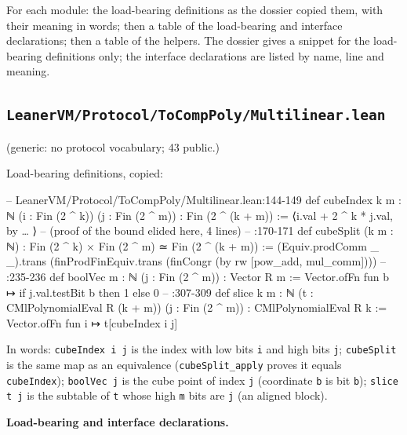 For each module: the load-bearing definitions as the dossier copied them, with their meaning in words; then a table of the load-bearing and interface declarations; then a table of the helpers. The dossier gives a snippet for the load-bearing definitions only; the interface declarations are listed by name, line and meaning.

\subsection{\texttt{LeanerVM/Protocol/ToCompPoly/Multilinear.lean}}

(generic: no protocol vocabulary; 43 public.)

Load-bearing definitions, copied:

\begin{leancode}
-- LeanerVM/Protocol/ToCompPoly/Multilinear.lean:144-149
def cubeIndex {k m : ℕ} (i : Fin (2 ^ k)) (j : Fin (2 ^ m)) : Fin (2 ^ (k + m)) :=
  ⟨i.val + 2 ^ k * j.val, by … ⟩            -- (proof of the bound elided here, 4 lines)
-- :170-171
def cubeSplit (k m : ℕ) : Fin (2 ^ k) × Fin (2 ^ m) ≃ Fin (2 ^ (k + m)) :=
  (Equiv.prodComm _ _).trans (finProdFinEquiv.trans (finCongr (by rw [pow_add, mul_comm])))
-- :235-236
def boolVec {m : ℕ} (j : Fin (2 ^ m)) : Vector R m :=
  Vector.ofFn fun b ↦ if j.val.testBit b then 1 else 0
-- :307-309
def slice {k m : ℕ} (t : CMlPolynomialEval R (k + m)) (j : Fin (2 ^ m)) :
    CMlPolynomialEval R k :=
  Vector.ofFn fun i ↦ t[cubeIndex i j]
\end{leancode}


In words: \texttt{cubeIndex i j} is the index with low bits \texttt{i} and high bits \texttt{j}; \texttt{cubeSplit} is the same map as an equivalence (\texttt{cubeSplit\_\allowbreak{}apply} proves it equals \texttt{cubeIndex}); \texttt{boolVec j} is the cube point of index \texttt{j} (coordinate \texttt{b} is bit \texttt{b}); \texttt{slice t j} is the subtable of \texttt{t} whose high \texttt{m} bits are \texttt{j} (an aligned block).

\par\medskip\noindent\textbf{Load-bearing and interface declarations.}

